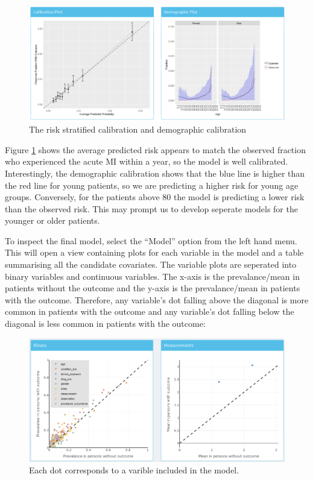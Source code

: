 \documentclass[11pt]{book}
\theoremstyle{definition}
\theoremstyle{definition}
\theoremstyle{definition}
\theoremstyle{remark}
\begin{document}
\begin{figure}

{\centering \includegraphics[width=0.8\linewidth]{images/PatientLevelPrediction/shiny/shinyPerformanceCal} 

}

\caption{The risk stratified calibration and demographic calibration}\label{fig:shinyPerformanceCal}
\end{figure}

Figure \ref{fig:shinyPerformanceCal} shows the average predicted risk appears to match the observed fraction who experienced the acute MI within a year, so the model is well calibrated. Interestingly, the demographic calibration shows that the blue line is higher than the red line for young patients, so we are predicting a higher risk for young age groups. Conversely, for the patients above 80 the model is predicting a lower risk than the observed risk. This may prompt us to develop seperate models for the younger or older patients.

To inspect the final model, select the ``Model'' option from the left hand menu. This will open a view containing plots for each variable in the model and a table summarising all the candidate covariates. The variable plots are seperated into binary variables and continuous variables. The x-axis is the prevalance/mean in patients without the outcome and the y-axis is the prevalance/mean in patients with the outcome. Therefore, any variable's dot falling above the diagonal is more common in patients with the outcome and any variable's dot falling below the diagonal is less common in patients with the outcome:

\begin{figure}

{\centering \includegraphics[width=0.8\linewidth]{images/PatientLevelPrediction/shiny/shinyModelPlots} 

}

\caption{Each dot corresponds to a varible included in the model.}\label{fig:shinyModelPlots}
\end{figure}
\end{document}
